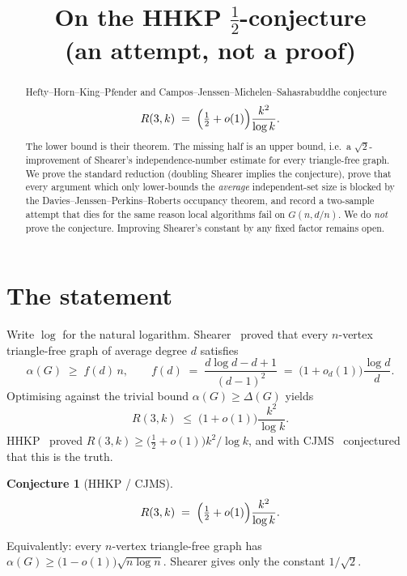 \documentclass[11pt]{article}
\title{On the HHKP $\tfrac12$-conjecture\\
\large (an attempt, not a proof)}
\date{}
\newtheorem{conjecture}[theorem]{Conjecture}
\theoremstyle{definition}
\begin{document}
\maketitle

\begin{abstract}
Hefty--Horn--King--Pfender and Campos--Jenssen--Michelen--Sahasrabuddhe conjecture
\[
  R(3,k)\;=\;\Bigl(\tfrac12+o(1)\Bigr)\frac{k^{2}}{\log k}.
\]
The lower bound is their theorem. The missing half is an upper bound, i.e.\ a
$\sqrt{2}$-improvement of Shearer's independence-number estimate for every
triangle-free graph. We prove the standard reduction (doubling Shearer implies
the conjecture), prove that every argument which only lower-bounds the
\emph{average} independent-set size is blocked by the Davies--Jenssen--Perkins--Roberts
occupancy theorem, and record a two-sample attempt that dies for the same reason
local algorithms fail on $G(n,d/n)$. We do \emph{not} prove the conjecture.
Improving Shearer's constant by any fixed factor remains open.
\end{abstract}

\section{The statement}

Write $\log$ for the natural logarithm.
Shearer~\cite{Shearer1983} proved that every $n$-vertex triangle-free graph of
average degree $d$ satisfies
\begin{equation}\label{eq:shearer}
  \alpha(G)\;\ge\; f(d)\,n,
  \qquad
  f(d)\;=\;\frac{d\log d-d+1}{(d-1)^{2}}\;=\;\bigl(1+o_d(1)\bigr)\frac{\log d}{d}.
\end{equation}
Optimising against the trivial bound $\alpha(G)\ge\Delta(G)$ yields
\begin{equation}\label{eq:shearer-R}
  R(3,k)\;\le\;\bigl(1+o(1)\bigr)\frac{k^{2}}{\log k}.
\end{equation}
HHKP~\cite{HHKP2025} proved $R(3,k)\ge\bigl(\tfrac12+o(1)\bigr)k^{2}/\log k$,
and with CJMS~\cite{CJMS2025} conjectured that this is the truth.

\begin{conjecture}[HHKP / CJMS]\label{conj:half}
\[
  R(3,k)\;=\;\Bigl(\tfrac12+o(1)\Bigr)\frac{k^{2}}{\log k}.
\]
\end{conjecture}

Equivalently: every $n$-vertex triangle-free graph has
$\alpha(G)\ge\bigl(1-o(1)\bigr)\sqrt{n\log n}$.
Shearer gives only the constant $1/\sqrt{2}$.
\end{document}
